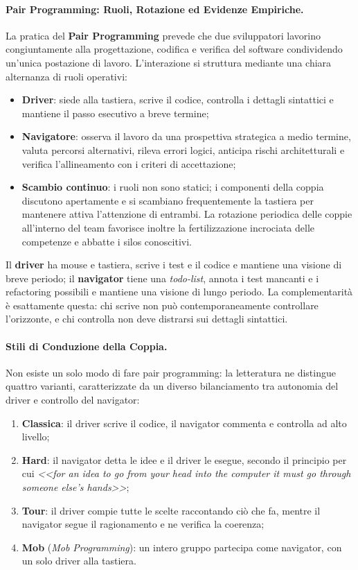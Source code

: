 \documentclass[12pt]{extarticle}
\begin{document}
\paragraph{Pair Programming: Ruoli, Rotazione ed Evidenze Empiriche.}
La pratica del \textbf{Pair Programming} prevede che due sviluppatori lavorino congiuntamente alla progettazione, codifica e verifica del software condividendo un'unica postazione di lavoro. L'interazione si struttura mediante una chiara alternanza di ruoli operativi:
\begin{itemize}
    \item \textbf{Driver}: siede alla tastiera, scrive il codice, controlla i dettagli sintattici e mantiene il passo esecutivo a breve termine;
    \item \textbf{Navigatore}: osserva il lavoro da una prospettiva strategica a medio termine, valuta percorsi alternativi, rileva errori logici, anticipa rischi architetturali e verifica l'allineamento con i criteri di accettazione;
    \item \textbf{Scambio continuo}: i ruoli non sono statici; i componenti della coppia discutono apertamente e si scambiano frequentemente la tastiera per mantenere attiva l'attenzione di entrambi. La rotazione periodica delle coppie all'interno del team favorisce inoltre la fertilizzazione incrociata delle competenze e abbatte i silos conoscitivi.
\end{itemize}

\noindent Il \textbf{driver} ha mouse e tastiera, scrive i test e il codice e mantiene una visione di breve periodo; il \textbf{navigator} tiene una \textit{todo-list}, annota i test mancanti e i refactoring possibili e mantiene una visione di lungo periodo. La complementarità è esattamente questa: chi scrive non può contemporaneamente controllare l'orizzonte, e chi controlla non deve distrarsi sui dettagli sintattici.

\paragraph{Stili di Conduzione della Coppia.}
Non esiste un solo modo di fare pair programming: la letteratura ne distingue quattro varianti, caratterizzate da un diverso bilanciamento tra autonomia del driver e controllo del navigator:
\begin{enumerate}
    \item \textbf{Classica}: il driver scrive il codice, il navigator commenta e controlla ad alto livello;
    \item \textbf{Hard}: il navigator detta le idee e il driver le esegue, secondo il principio per cui \textit{<<for an idea to go from your head into the computer it must go through someone else's hands>>};
    \item \textbf{Tour}: il driver compie tutte le scelte raccontando ciò che fa, mentre il navigator segue il ragionamento e ne verifica la coerenza;
    \item \textbf{Mob} (\textit{Mob Programming}): un intero gruppo partecipa come navigator, con un solo driver alla tastiera.
\end{enumerate}
\end{document}
